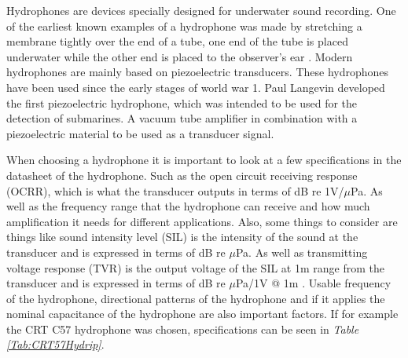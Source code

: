 Hydrophones are devices specially designed for underwater sound recording.
One of the earliest known examples of a hydrophone was made by stretching a membrane tightly over the end of a tube, one end of the tube is placed underwater while the other end is placed to the observer's ear \cite{wood_a_b_textbook_1946}. 
Modern hydrophones are mainly based on piezoelectric transducers.
These hydrophones have been used since the early stages of world war 1.
Paul Langevin developed the first piezoelectric hydrophone, which was intended to be used for the detection of submarines.
A vacuum tube amplifier in combination with a piezoelectric material to be used as a transducer signal\cite{van_der_kloot_great_2014}.

When choosing a hydrophone it is important to look at a few specifications in the datasheet of the hydrophone. 
Such as the open circuit receiving response (OCRR), which is what the transducer outputs in terms of dB re 1V/$\mu$Pa.
As well as the frequency range that the hydrophone can receive and how much amplification it needs for different applications.
Also, some things to consider are things like
sound intensity level (SIL) is the intensity of the sound at the transducer and is expressed in terms of dB re $\mu$Pa.
As well as transmitting voltage response (TVR) is the output voltage of the SIL at 1m range from the transducer and is expressed in terms of dB re $\mu$Pa/1V @ 1m \cite{ethem_mutlu_sozer_underwater_nodate}. 
Usable frequency of the hydrophone, directional patterns of the hydrophone and if it applies the nominal capacitance of the hydrophone are also important factors. 
If for example the CRT C57 hydrophone was chosen, specifications can be seen in \textit{Table \ref{Tab:CRT57Hydrip}}.


